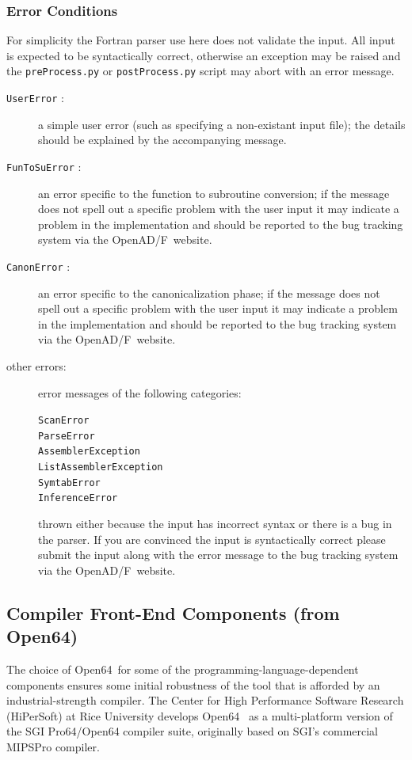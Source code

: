 \documentclass{book}
\newcommand{\OpenADF}{OpenAD/F}
\newcommand{\OpenSixtyFour}{Open64}
\begin{document}
\subsubsection{Error Conditions}\label{sec:canonErrors}
For simplicity the Fortran parser use here does not validate the input. 
All input is expected to be syntactically correct, otherwise an exception
may be raised and the \lstinline{preProcess.py} or 
\lstinline{postProcess.py} script may abort with an error message.  
\begin{description}
\item[{\tt UserError} : ] a simple user error (such as specifying a non-existant input file); the 
details  should be explained by the accompanying message. 
\item[{\tt FunToSuError} : ] an error specific to the function to subroutine 
conversion; 
if the message does not spell out a specific problem with the user input it may indicate a 
problem in the implementation and should be reported to the bug tracking system via the \OpenADF\ website.
\item[{\tt CanonError} : ] an error specific to the canonicalization phase; 
if the message does not spell out a specific problem with the user input it may indicate a 
problem in the implementation and should be reported to the bug tracking system via the \OpenADF\ website.
\item[other errors:] error messages of the following categories:
\begin{description}
\item[{\tt ScanError}]
\item[{\tt ParseError}]
\item[{\tt AssemblerException}]
\item[{\tt ListAssemblerException}]
\item[{\tt SymtabError}]
\item[{\tt InferenceError}]
\end{description}
thrown either because the input has incorrect syntax or there is a bug in the parser. 
If you are convinced the input is syntactically correct please submit the input along with 
the error message to the bug tracking system via the \OpenADF\ website. 
\end{description}
\subsection{Compiler Front-End Components (from \OpenSixtyFour)} \label{sec:open64FeBe}
The choice of \OpenSixtyFour\ for some of the programming-language-dependent 
components ensures some initial robustness of the tool that is afforded by an 
industrial-strength compiler. 
The Center for High Performance Software Research (HiPerSoft) at Rice University 
develops \OpenSixtyFour\ \cite{open64Web} as a 
multi-platform version of the SGI Pro64/Open64 compiler
suite, originally based on SGI's commercial MIPSPro compiler.
\end{document}
